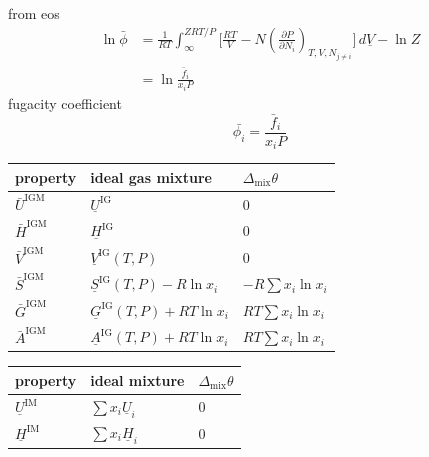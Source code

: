 \documentclass{article}
\begin{document}
\begin{minipage}[t]{0.5\textwidth}
    

    from eos
    \begin{align*}
        \ln \bar{\phi}  &= \frac{1}{RT}\int_{\infty}^{ZRT/P} \biggl[  \frac{RT}{V} - N \left(\frac{ \partial P }{ \partial N_{i} } \right)_{T,V,N_{j \neq i}} \biggr] \, d\underline{V} - \ln Z \\
        &= \ln \frac{\bar{f}_i}{x_i P}
    \end{align*}
    fugacity coefficient
    \[ \bar{\phi_i} = \frac{\bar{f}_i}{x_i P}\]


\end{minipage}
\begin{minipage}[t]{0.47\textwidth}
    \begin{center}
        \begin{tabular}{@{}lll@{}}
            \toprule
            property                                  & ideal gas mixture                           & $\Delta_{\text{mix}}\theta$ \\ \midrule
            $\bar{U}^{\text{IGM}}$                    & $\underline{U}^{\text{IG}}$                    & 0                           \\
            $\bar{H}^{\text{IGM}}$                    & $\underline{H}^{\text{IG}}$                    & 0                           \\
            $\bar{V}^{\text{IGM}}$ & $\underline{V}^{\text{IG}}(T,P)$               & 0                           \\
            $\bar{S}^{\text{IGM}}$ & $\underline{S}^{\text{IG}}(T,P) - R \ln x_{i}$  & $-R \sum x_{i} \ln x_{i}$   \\
            $\bar{G}^{\text{IGM}}$                    & $\underline{G}^{\text{IG}}(T,P) + RT \ln x_{i}$ & $RT \sum x_{i} \ln x_{i}$   \\ 
            $\bar{A}^{\text{IGM}}$                    & $\underline{A}^{\text{IG}}(T,P) + RT \ln x_{i}$ & $RT \sum x_{i} \ln x_{i}$   \\ 
            \bottomrule
        \end{tabular}
        \begin{tabular}{@{}lll@{}}
            \toprule
            property                                  & ideal mixture                           & $\Delta_{\text{mix}}\theta$ \\ \midrule
            $\underline{U}^{\text{IM}}$                    & $\sum x_i \underline{U}_i$                    & 0                           \\
            $\underline{H}^{\text{IM}}$                    & $\sum x_i \underline{H}_i$                    & 0                           \\

\end{tabular}
\end{center}
\end{minipage}
\end{document}

